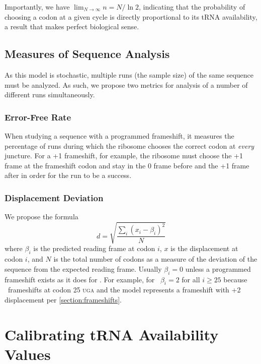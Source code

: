 \documentclass[12pt]{article}
\numberwithin{equation}{section}
\begin{document}
Importantly, we have $\displaystyle\lim_{N\rightarrow\infty} n = N/\ln{2}$, indicating 
that the probability of choosing a codon at a given cycle is directly proportional 
to its tRNA availability, a result that makes perfect biological sense.

\subsection{Measures of Sequence Analysis}

As this model is stochastic, multiple runs (the sample size) of the same sequence must be analyzed.
As such, we propose two metrics for analysis of a number of different runs 
simultaneously. 

\subsubsection{Error-Free Rate}

When studying a
sequence with a programmed frameshift, it measures the percentage of runs 
during which the ribosome chooses the correct codon
at \emph{every} juncture.  For a +1 frameshift, for example, the ribosome must
choose the +1 frame at the frameshift codon and stay in the 0 frame before
and the +1 frame after in order for the run to be a success.

\subsubsection{Displacement Deviation}
\label{section:deviation}

We propose the formula
\begin{equation}
    \label{eqn:lbd}
    d = \sqrt{\frac{\sum_i \left(x_i - \beta_i\right)^2}{N}}
\end{equation}
where $\beta_i$ is the predicted reading frame at codon $i$, $x$ is the displacement at codon $i$,
and $N$ is the total number of codons as a measure of the deviation of the sequence
from the expected reading frame.  Usually $\beta_i = 0$ unless a
programmed frameshift exists as it does for \prfB.
For example, for \prfB\ $\beta_i = 2$ for all $i \geq 25$ because \prfB\ frameshifts at codon 25 \textsc{uga}
and the model represents a frameshift with +2 displacement per \autoref{section:frameshifts}.

\section{Calibrating tRNA Availability Values}
\end{document}
